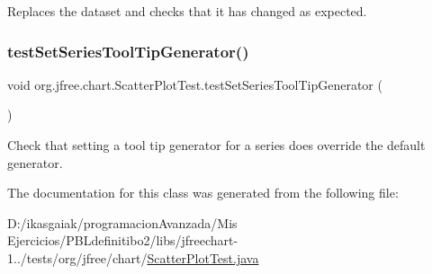 Replaces the dataset and checks that it has changed as expected. \mbox{\label{classorg_1_1jfree_1_1chart_1_1_scatter_plot_test_a42e9fe842b5d6f0d756680fe685e7a1b}} 
\subsubsection{\texorpdfstring{test\+Set\+Series\+Tool\+Tip\+Generator()}{testSetSeriesToolTipGenerator()}}
{\footnotesize\ttfamily void org.\+jfree.\+chart.\+Scatter\+Plot\+Test.\+test\+Set\+Series\+Tool\+Tip\+Generator (\begin{DoxyParamCaption}{ }\end{DoxyParamCaption})}

Check that setting a tool tip generator for a series does override the default generator. 

The documentation for this class was generated from the following file\+:\begin{DoxyCompactItemize}
\item 
D\+:/ikasgaiak/programacion\+Avanzada/\+Mis Ejercicios/\+P\+B\+Ldefinitibo2/libs/jfreechart-\/1../tests/org/jfree/chart/\mbox{\hyperlink{_scatter_plot_test_8java}{Scatter\+Plot\+Test.\+java}}\end{DoxyCompactItemize}
